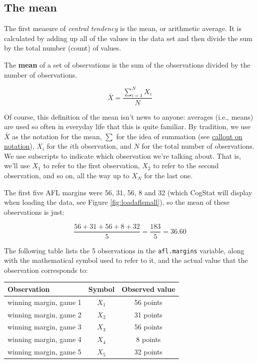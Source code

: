 \documentclass[
  11pt,
  a4paper,
  twoside,symmetric,openright]{book}
\theoremstyle{break}
\theoremstyle{break}
\begin{document}
\subsection{The mean}\label{mean}

The first measure of \emph{central tendency} is the mean, or arithmetic average. It is calculated by adding up all of the values in the data set and then divide the sum by the total number (count) of values.

\begin{definition}[Mean]
\protect\hypertarget{def:defmean}{}\label{def:defmean}The \textbf{mean} of a set of observations is the sum of the observations divided by the number of observations.

\[
\bar{X} = \frac{\sum_{i=1}^N X_i}{N}
\]
\end{definition}

Of course, this definition of the mean isn't news to anyone: averages (i.e., means) are used so often in everyday life that this is quite familiar. By tradition, we use \(\bar{X}\) as the notation for the mean, \(\scriptstyle\sum\) for the idea of summation (see \hyperref[summation]{callout on notation}), \(X_i\) for the \(i\)th observation, and \(N\) for the total number of observations. We use subscripts to indicate which observation we're talking about. That is, we'll use \(X_1\) to refer to the first observation, \(X_2\) to refer to the second observation, and so on, all the way up to \(X_N\) for the last one.

\begin{example}[Mean]
\protect\hypertarget{exm:exmean}{}\label{exm:exmean}

The first five AFL margins were 56, 31, 56, 8 and 32 (which CogStat will display when loading the data, see Figure \ref{fig:loadaflsmall}), so the mean of these observations is just:

\[
\frac{56 + 31 + 56 + 8 + 32}{5} = \frac{183}{5} = 36.60
\]

The following table lists the 5 observations in the \texttt{afl.margins} variable, along with the mathematical symbol used to refer to it, and the actual value that the observation corresponds to:

\begin{table}[H]
\centering
\begin{tabular}{lcc}
\toprule
Observation & Symbol & Observed value\\
\midrule
winning margin, game 1 & $X_1$ & 56 points\\
winning margin, game 2 & $X_2$ & 31 points\\
winning margin, game 3 & $X_3$ & 56 points\\
winning margin, game 4 & $X_4$ & 8 points\\
winning margin, game 5 & $X_5$ & 32 points\\
\bottomrule
\end{tabular}
\end{table}

\end{example}
\end{document}

